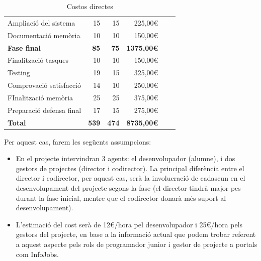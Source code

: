 \begin{table}[htb]
{\begin{tabular}{lrrrrr}
Ampliació del sistema                        & 15                                           & 15                                              & 225,00\euro                                        \\
Documentació memòria                         & 10                                           & 10                                            & 150,00\euro                                        \\
\hline
\textbf{Fase final}                          & \textbf{85}                                  & \textbf{75}                                 & \textbf{1375,00\euro}                              \\
\hline
Finalització tasques                         & 10                                           & 10                                          & 150,00\euro                                        \\
Testing                                      & 19                                           & 15                                           & 325,00\euro                                        \\
Comprovació satisfacció                      & 14                                           & 10                                           & 250,00\euro                                        \\
FInalització memòria                         & 25                                           & 25                                          & 375,00\euro                                        \\
Preparació defensa final                     & 17                                           & 15                                          & 275,00\euro                                        \\
\hline
\textbf{Total}                               & \textbf{539}                                 & \textbf{474}                                & \textbf{8735,00\euro}       \\
\hline                      
\end{tabular}}
\caption{Costos directes}
\end{table}

Per aquest cas, farem les següents assumpcions:

\begin{itemize}
\item En el projecte intervindran 3 agents: el desenvolupador (alumne), i dos gestors de projectes (director i codirector). La principal diferència entre el director i codirector, per aquest cas, serà la involucració de cadascun en el desenvolupament del projecte segons la fase (el director tindrà major pes durant la fase inicial, mentre que el codirector donarà més suport al desenvolupament).
\item L’estimació del cost serà de 12\euro /hora pel desenvolupador i 25\euro /hora pels gestors del projecte, en base a la informació actual que podem trobar referent a aquest aspecte pels rols de programador junior i gestor de projecte a portals com InfoJobs.
\end{itemize}

